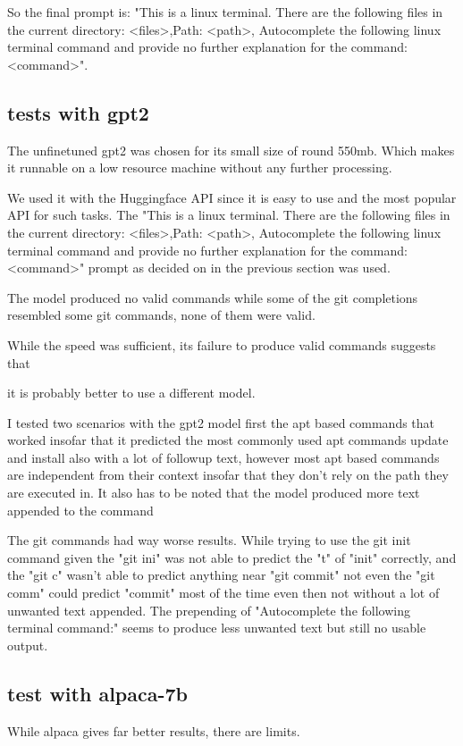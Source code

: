 So the final prompt is: "This is a linux terminal. There are the following files in the current  directory: <files>,Path: <path>, Autocomplete the following linux terminal command and provide no further explanation for the command: <command>".


\pagebreak
\subsection{tests with gpt2}\raggedbottom

The unfinetuned gpt2 was chosen for its small size of round 550mb. Which makes it runnable on a low resource machine without any further processing. 

We used it with the Huggingface API since it is easy to use and the most popular API for such tasks. The "This is a linux terminal. There are the following files in the current  directory: <files>,Path: <path>, Autocomplete the following linux terminal command and provide no further explanation for the command: <command>" prompt as decided on in the previous section was used.


The model produced no valid commands while some of the git  completions resembled some git commands, none of them were valid.

While the speed was sufficient, its failure to produce valid commands suggests that

it is probably better to use a different model. 





I tested two scenarios with the gpt2 model first the apt based commands that worked insofar that it predicted the most commonly used apt commands update and install also with a lot of followup text, however most apt based commands are independent from their context insofar that they don't rely on the path they are executed in. It also has to be noted that the model produced more text appended to the command 


The git commands had way worse results. While trying to use the git  init command given the "git ini" was not able to predict the "t" of "init" correctly, and the "git c" wasn't able to predict anything near "git commit" not even  the "git comm" could predict "commit" most of the time even then not without a lot of unwanted text appended. The prepending of "Autocomplete the following terminal command:" seems to produce less unwanted text but still no usable output. 

\subsection{test with alpaca-7b}
While alpaca gives far better results, there are limits.


